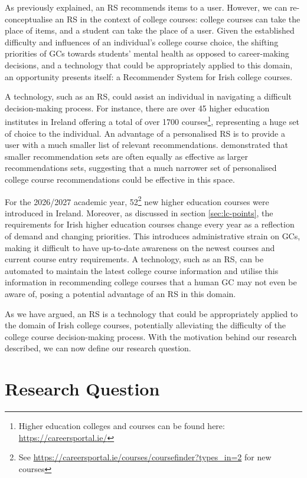 As previously explained, an RS recommends items to a user.
However, we can re-conceptualise an RS in the context of college courses:
college courses can take the place of items, and a student can take the place of a user.
Given the established difficulty and influences of an individual's college course choice, the shifting priorities of GCs towards students' mental health as opposed to career-making decisions,
and a technology that could be appropriately applied to this domain,
an opportunity presents itself: a Recommender System for Irish college courses.

A technology, such as an RS, could assist an individual in navigating a difficult decision-making process.
For instance, there are over 45 higher education institutes in Ireland offering a total of over 1700 courses\footnote{\label{}Higher education colleges and courses can be found here: \url{https://careersportal.ie/}},
representing a huge set of choice to the individual.
An advantage of a personalised RS is to provide a user with a much smaller list of relevant recommendations.
\cite{long2025choice} demonstrated that smaller recommendation sets are often equally as effective as larger recommendations sets,
suggesting that a much narrower set of personalised college course recommendations could be effective in this space.

For the 2026/2027 academic year, 52\footnote{See \url{https://careersportal.ie/courses/coursefinder?types_in=2} for new courses} new higher education courses 
were introduced in Ireland.
Moreover, as discussed in section \ref{sec:lc-points}, the requirements for Irish higher education courses 
change every year as a reflection of demand and changing priorities.
This introduces administrative strain on GCs, making it difficult to have up-to-date awareness on the newest courses 
and current course entry requirements.
A technology, such as an RS, can be automated to maintain the latest college course information
and utilise this information in recommending college courses that a human GC may not even be aware of, 
posing a potential advantage of an RS in this domain.

As we have argued, an RS is a technology that could be appropriately applied to the domain of Irish college courses,
potentially alleviating the difficulty of the college course decision-making process.
With the motivation behind our research described, we can now define our research question.

\section{Research Question}
\label{sec:research-question}


